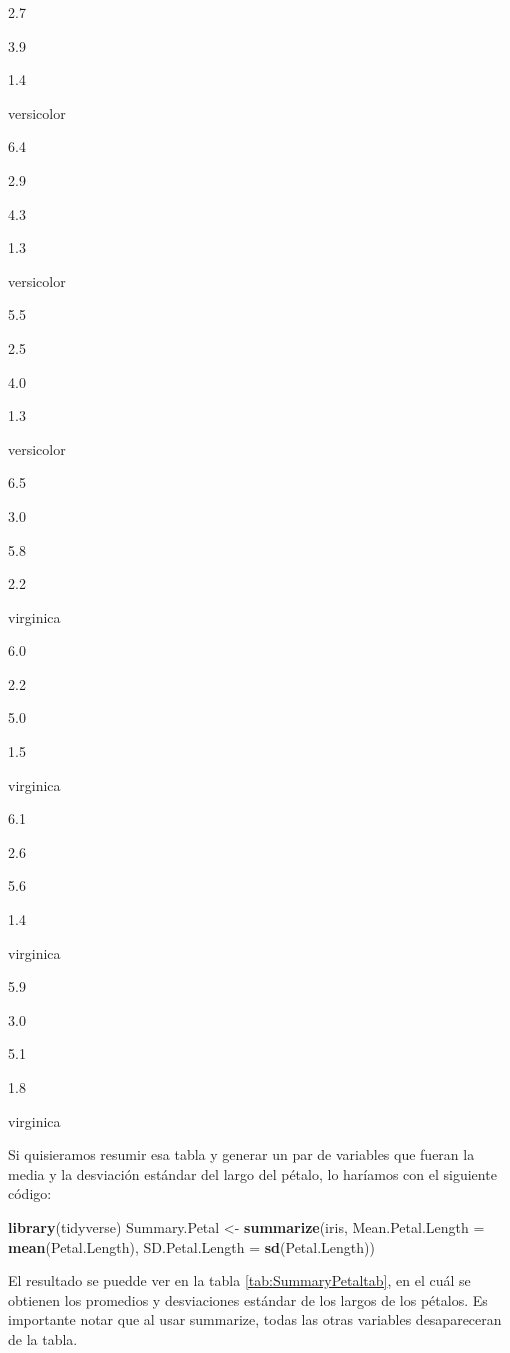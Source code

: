 \documentclass[]{book}
\newenvironment{Shaded}{\begin{snugshade}}{\end{snugshade}}
\newcommand{\DataTypeTok}[1]{\textcolor[rgb]{0.13,0.29,0.53}{#1}}
\newcommand{\KeywordTok}[1]{\textcolor[rgb]{0.13,0.29,0.53}{\textbf{#1}}}
\newcommand{\NormalTok}[1]{#1}
\newcommand{\StringTok}[1]{\textcolor[rgb]{0.31,0.60,0.02}{#1}}
\begin{document}
2.7

3.9

1.4

versicolor

6.4

2.9

4.3

1.3

versicolor

5.5

2.5

4.0

1.3

versicolor

6.5

3.0

5.8

2.2

virginica

6.0

2.2

5.0

1.5

virginica

6.1

2.6

5.6

1.4

virginica

5.9

3.0

5.1

1.8

virginica

Si quisieramos resumir esa tabla y generar un par de variables que
fueran la media y la desviación estándar del largo del pétalo, lo
haríamos con el siguiente código:

\begin{Shaded}
\begin{Highlighting}[]
\KeywordTok{library}\NormalTok{(tidyverse)}
\NormalTok{Summary.Petal <-}\StringTok{ }\KeywordTok{summarize}\NormalTok{(iris, }\DataTypeTok{Mean.Petal.Length =} \KeywordTok{mean}\NormalTok{(Petal.Length), }
    \DataTypeTok{SD.Petal.Length =} \KeywordTok{sd}\NormalTok{(Petal.Length))}
\end{Highlighting}
\end{Shaded}

El resultado se puedde ver en la tabla \ref{tab:SummaryPetaltab}, en el
cuál se obtienen los promedios y desviaciones estándar de los largos de
los pétalos. Es importante notar que al usar summarize, todas las otras
variables desapareceran de la tabla.
\end{document}
